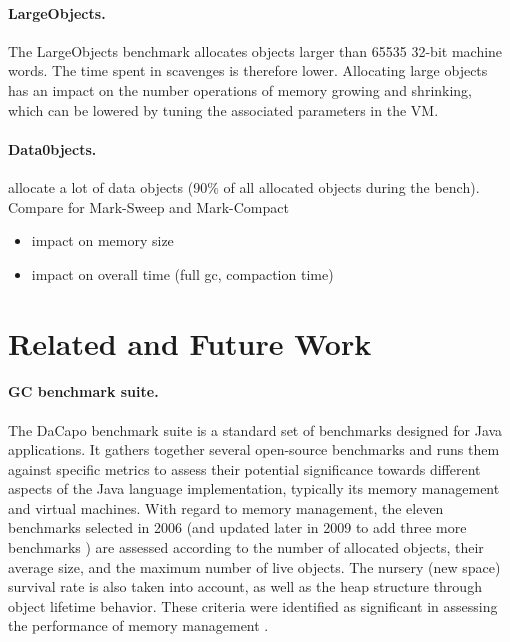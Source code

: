 \documentclass[10pt, sigplan]{acmart}
\newcommand{\eem}[1]{\color{green}\fbox{\bfseries\sffamily\scriptsize Eliot:}{\sf\small$\blacktriangleright$\textit{#1}$\blacktriangleleft$}\color{black}}
\begin{document}
\paragraph{LargeObjects.} The LargeObjects benchmark allocates objects larger than 65535 32-bit machine words. The time spent in scavenges is therefore lower. Allocating large objects has an impact on the number operations of memory growing and shrinking, which can be lowered by tuning the associated parameters in the VM. 
\paragraph{Data0bjects.}
 allocate a lot of data objects (90\% of all allocated objects during the bench). Compare for Mark-Sweep and Mark-Compact
\begin{itemize}
\item impact on memory size
\item impact on overall time (full gc, compaction time)
\end{itemize}

\section{Related and Future Work}

\paragraph{GC benchmark suite.} The DaCapo benchmark suite \cite{DacapoBench} is a standard set of benchmarks designed for Java applications. It gathers together several open-source benchmarks and runs them against specific metrics to assess their potential significance towards different aspects of the Java language implementation, typically its memory management and virtual machines.
With regard to memory management, the eleven benchmarks selected in 2006 (and updated later in 2009 to add three more benchmarks \cite{DaCapo}) are assessed according to the number of allocated objects, their average size, and the maximum number of live objects. The nursery (new space) survival rate is also taken into account, as well as the heap structure through object lifetime behavior.
These criteria were identified as significant in assessing the performance of memory management \eem{by whom?}. 

%
\end{document}
